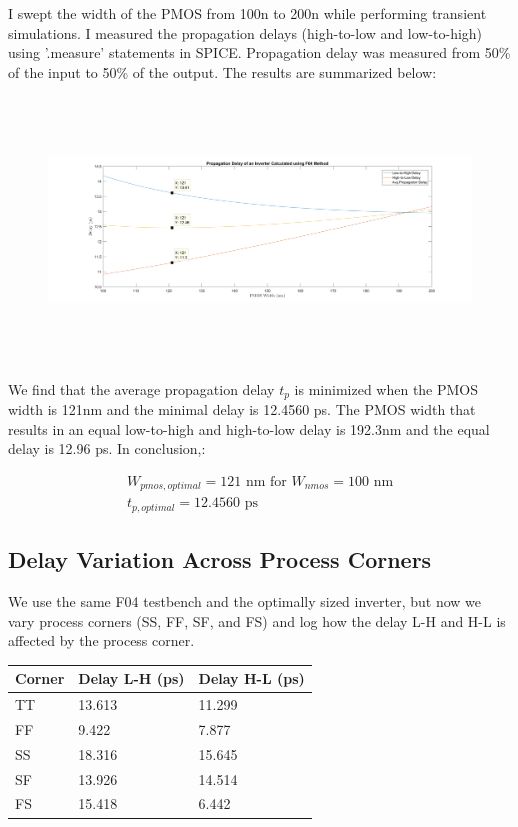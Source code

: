 \documentclass[11pt]{article}
\begin{document}
I swept the width of the PMOS from 100n to 200n while performing transient simulations. I measured the propagation delays (high-to-low and low-to-high) using '.measure' statements in SPICE. Propagation delay was measured from 50\% of the input to 50\% of the output. The results are summarized below:

\begin{figure}[H]
	\centerline{\includegraphics[height=7cm]{images/inverter_delay.png}}
\end{figure}

We find that the average propagation delay $t_p$ is minimized when the PMOS width is 121nm and the minimal delay is 12.4560 ps. The PMOS width that results in an equal low-to-high and high-to-low delay is 192.3nm and the equal delay is 12.96 ps. In conclusion,:

\begin{eqnarray}
W_{pmos,optimal} = 121 \text{ nm for } W_{nmos} = 100 \text{ nm} \nonumber \\
t_{p,optimal} = 12.4560 \text{ ps} \nonumber
\end{eqnarray}

\subsection{Delay Variation Across Process Corners}
We use the same F04 testbench and the optimally sized inverter, but now we vary process corners (SS, FF, SF, and FS) and log how the delay L-H and H-L is affected by the process corner.

\begin{center}
\begin{tabular}{| l | l | l |} \hline
	Corner & Delay L-H (ps) & Delay H-L (ps) \\ \hline
	TT & 13.613 & 11.299 \\ \hline
	FF & 9.422 & 7.877 \\ \hline
	SS & 18.316 & 15.645 \\ \hline
	SF & 13.926 & 14.514 \\ \hline
	FS & 15.418 & 6.442\\ \hline
\end{tabular}
\end{center}
\end{document}
